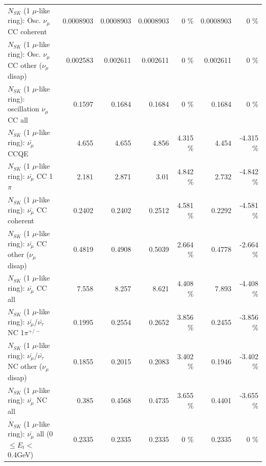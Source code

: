 \begin{table}
\begin{tabular}{| l | r | r | r  r | r  r |}
                        $N_{SK}$ (1 $\mu$-like ring): Osc. $\nu_\mu$ CC coherent &       0.0008903 &       0.0008903 &       0.0008903 &        0 \%  &       0.0008903 &        0 \%  \\ 
         $N_{SK}$ (1 $\mu$-like ring): Osc. $\nu_\mu$ CC other ($\nu_\mu$ disap) &        0.002583 &        0.002611 &        0.002611 &        0 \%  &        0.002611 &        0 \%  \\ 
                      $N_{SK}$ (1 $\mu$-like ring): oscillation $\nu_\mu$ CC all &          0.1597 &          0.1684 &          0.1684 &        0 \%  &          0.1684 &        0 \%  \\ 
\hline
\hline
                              $N_{SK}$ (1 $\mu$-like ring): $\bar{\nu_\mu}$ CCQE &           4.655 &           4.655 &           4.856 &    4.315 \%  &           4.454 &   -4.315 \%  \\ 
                         $N_{SK}$ (1 $\mu$-like ring): $\bar{\nu_\mu}$ CC 1$\pi$ &           2.181 &           2.871 &            3.01 &    4.842 \%  &           2.732 &   -4.842 \%  \\ 
                       $N_{SK}$ (1 $\mu$-like ring): $\bar{\nu_\mu}$ CC coherent &          0.2402 &          0.2402 &          0.2512 &    4.581 \%  &          0.2292 &   -4.581 \%  \\ 
        $N_{SK}$ (1 $\mu$-like ring): $\bar{\nu_\mu}$ CC other ($\nu_\mu$ disap) &          0.4819 &          0.4908 &          0.5039 &    2.664 \%  &          0.4778 &   -2.664 \%  \\ 
                          $N_{SK}$ (1 $\mu$-like ring): $\bar{\nu_{\mu}}$ CC all &           7.558 &           8.257 &           8.621 &    4.408 \%  &           7.893 &   -4.408 \%  \\ 
\hline
  $N_{SK}$ (1 $\mu$-like ring): $\bar{\nu_\mu}$/$\bar{\nu_\tau}$ NC 1$\pi^{+/-}$ &          0.1995 &          0.2554 &          0.2652 &    3.856 \%  &          0.2455 &   -3.856 \%  \\ 
$N_{SK}$ (1 $\mu$-like ring): $\bar{\nu_\mu}$/$\bar{\nu_\tau}$ NC other ($\nu_\mu$ disap) &          0.1855 &          0.2015 &          0.2083 &    3.402 \%  &          0.1946 &   -3.402 \%  \\ 
                          $N_{SK}$ (1 $\mu$-like ring): $\bar{\nu_{\mu}}$ NC all &           0.385 &          0.4568 &          0.4735 &    3.655 \%  &          0.4401 &   -3.655 \%  \\ 
\hline
   $N_{SK}$ (1 $\mu$-like ring): $\bar{\nu_{\mu}}$ all (0 $\leq E_{t} <$ 0.4GeV) &          0.2335 &          0.2335 &          0.2335 &        0 \%  &          0.2335 &        0 \%  \\ 

\end{tabular}
\end{table}
